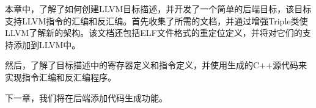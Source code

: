 本章中，了解了如何创建LLVM目标描述，并开发了一个简单的后端目标，该目标支持LLVM指令的汇编和反汇编。首先收集了所需的文档，并通过增强Triple类使LLVM了解新的架构。该文档还包括ELF文件格式的重定位定义，并将对它们的支持添加到LLVM中。

然后，了解了目标描述中的寄存器定义和指令定义，并使用生成的C++源代码来实现指令汇编和反汇编程序。

下一章，我们将在后端添加代码生成功能。